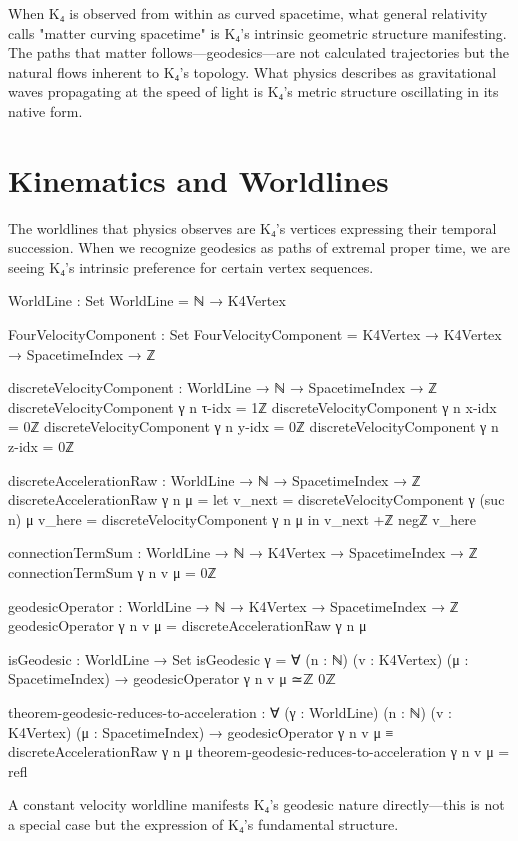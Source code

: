 \documentclass[11pt,a4paper]{book}
\begin{document}
When K₄ is observed from within as curved spacetime, what general relativity calls "matter curving spacetime" is K₄'s intrinsic geometric structure manifesting. The paths that matter follows—geodesics—are not calculated trajectories but the natural flows inherent to K₄'s topology. What physics describes as gravitational waves propagating at the speed of light is K₄'s metric structure oscillating in its native form.

\section{Kinematics and Worldlines}

The worldlines that physics observes are K₄'s vertices expressing their temporal succession. When we recognize geodesics as paths of extremal proper time, we are seeing K₄'s intrinsic preference for certain vertex sequences.

\begin{code}
WorldLine : Set
WorldLine = ℕ → K4Vertex

FourVelocityComponent : Set
FourVelocityComponent = K4Vertex → K4Vertex → SpacetimeIndex → ℤ

discreteVelocityComponent : WorldLine → ℕ → SpacetimeIndex → ℤ
discreteVelocityComponent γ n τ-idx = 1ℤ
discreteVelocityComponent γ n x-idx = 0ℤ
discreteVelocityComponent γ n y-idx = 0ℤ
discreteVelocityComponent γ n z-idx = 0ℤ

discreteAccelerationRaw : WorldLine → ℕ → SpacetimeIndex → ℤ
discreteAccelerationRaw γ n μ = 
  let v_next = discreteVelocityComponent γ (suc n) μ
      v_here = discreteVelocityComponent γ n μ
  in v_next +ℤ negℤ v_here

connectionTermSum : WorldLine → ℕ → K4Vertex → SpacetimeIndex → ℤ
connectionTermSum γ n v μ = 0ℤ

geodesicOperator : WorldLine → ℕ → K4Vertex → SpacetimeIndex → ℤ
geodesicOperator γ n v μ = discreteAccelerationRaw γ n μ

isGeodesic : WorldLine → Set
isGeodesic γ = ∀ (n : ℕ) (v : K4Vertex) (μ : SpacetimeIndex) → 
  geodesicOperator γ n v μ ≃ℤ 0ℤ

theorem-geodesic-reduces-to-acceleration :
  ∀ (γ : WorldLine) (n : ℕ) (v : K4Vertex) (μ : SpacetimeIndex) →
  geodesicOperator γ n v μ ≡ discreteAccelerationRaw γ n μ
theorem-geodesic-reduces-to-acceleration γ n v μ = refl
\end{code}

A constant velocity worldline manifests K₄'s geodesic nature directly—this is not a special case but the expression of K₄'s fundamental structure.
\end{document}
